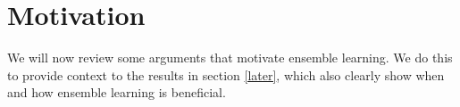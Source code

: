 \documentclass[
    a4paper, %
	fontsize=10pt, %
	twoside=false, %
]{kaobook}
\begin{document}







\section{Motivation}
\label{sec:ensemble-learning-motivation}

We will now review some arguments that motivate ensemble learning. We do this to provide context to the results in section \ref{later}, which also clearly show when and how ensemble learning is beneficial.
\end{document}
